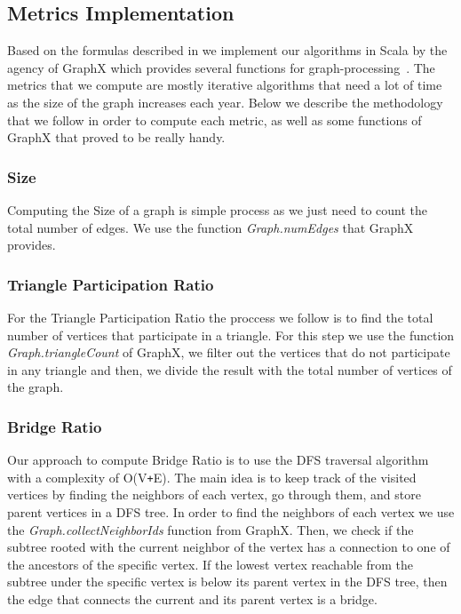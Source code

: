 \subsection{Metrics Implementation}

Based on the formulas described in  we implement our
algorithms in Scala by the agency of GraphX which provides several functions
for graph-processing~\cite{graphxDoc}. The metrics that we compute are mostly
iterative algorithms that need a lot of time as the size of the graph increases each year. 
Below we describe the methodology that we follow in order to
compute each metric, as well as some functions of GraphX that proved to be really handy.

\subsubsection{Size}
Computing the Size of a graph is simple process as we just need to count the total number of edges. We use the function \textit{Graph.numEdges} that GraphX provides.

\subsubsection{Triangle Participation Ratio}
For the Triangle Participation Ratio the proccess we follow is to find the total number of vertices that participate in a triangle. For this step we use the function \textit{Graph.triangleCount} of GraphX, we filter out the vertices that do not participate in any triangle and then, we divide the result with the total number of vertices of the graph.

\subsubsection{Bridge Ratio} Our approach to compute Bridge Ratio is to use the
DFS traversal algorithm with a complexity of O(V\texttt{+}E). The main idea is
to keep track of the visited vertices by finding the neighbors of each vertex,
go through them, and store parent vertices in a DFS tree. In order to find the
neighbors of each vertex we use the \textit{Graph.collectNeighborIds} function from
GraphX. Then, we check if the subtree rooted with the current neighbor of the
vertex has a connection to one of the ancestors of the specific vertex. If the
lowest vertex reachable from the subtree under the specific vertex is below its
parent vertex in the DFS tree, then the edge that connects the current 
and its parent vertex is a bridge.

